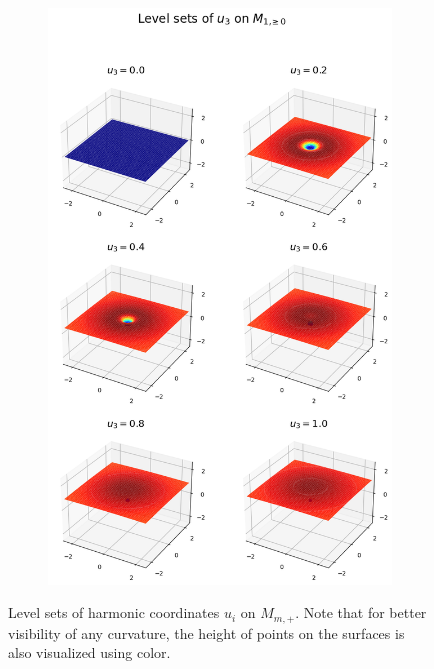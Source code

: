 \documentclass[titlepage,numbers=noenddot,headinclude,oneside,%
footinclude=true,cleardoublepage=empty,%
BCOR=5mm,paper=a4,fontsize=11pt,%
english,%
]{scrartcl}
\begin{document}
\begin{figure}
\begin{subfigure}{.45\textwidth}
    \end{subfigure}
    \begin{subfigure}{.45\textwidth}
        \includegraphics[width=\textwidth]{figures/level_sets_u3_unmodified.png}
    \end{subfigure}
    \label{fig:level_sets_unmodified}
    \caption{Level sets of harmonic coordinates \( u_i \) on \( M_{m,+} \). Note that for better visibility of any curvature, the height of points on the surfaces is also visualized using color.}
\end{figure}
\end{document}
